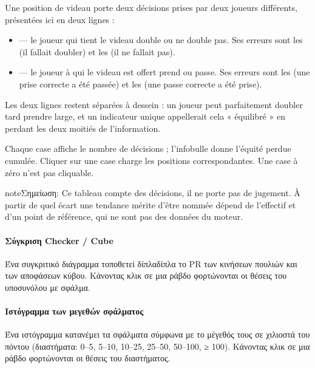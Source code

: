 \documentclass[letterpaper,10pt,greek]{sphinxmanual}
\begin{document}
\sphinxAtStartPar
Une position de videau porte deux décisions prises par deux joueurs
différents, présentées ici en deux lignes :
\begin{itemize}
\item {} 
\sphinxAtStartPar
{} — le joueur qui tient le videau double ou ne double pas. Ses
erreurs sont les  (il fallait doubler) et les  (il ne fallait pas).

\item {} 
\sphinxAtStartPar
{} — le joueur à qui le videau est offert prend ou passe. Ses
erreurs sont les  (une prise correcte a été passée) et les
 (une passe correcte a été prise).

\end{itemize}

\sphinxAtStartPar
Les deux lignes restent séparées à dessein : un joueur peut parfaitement
doubler tard  prendre large, et un indicateur unique appellerait cela
« équilibré » en perdant les deux moitiés de l’information.

\sphinxAtStartPar
Chaque case affiche le nombre de décisions ; l’infobulle donne l’équité perdue
cumulée. Cliquer sur une case charge les positions correspondantes. Une case à
zéro n’est pas cliquable.

\begin{sphinxadmonition}{note}{Σημείωση:}
\sphinxAtStartPar
Ce tableau compte des décisions, il ne porte pas de jugement. À partir de
quel écart une tendance mérite d’être nommée dépend de l’effectif et d’un
point de référence, qui ne sont pas des données du moteur.
\end{sphinxadmonition}


\paragraph{Σύγκριση Checker / Cube}
\label{\detokenize{manuel:repartition-checker-cube}}
\sphinxAtStartPar
Ένα συγκριτικό διάγραμμα τοποθετεί δίπλα\sphinxhyphen{}δίπλα το PR των κινήσεων πουλιών και των αποφάσεων κύβου. Κάνοντας κλικ σε μια ράβδο φορτώνονται οι θέσεις του υποσυνόλου με σφάλμα.


\paragraph{Ιστόγραμμα των μεγεθών σφάλματος}
\label{\detokenize{manuel:histogramme-des-magnitudes-d-erreur}}
\sphinxAtStartPar
Ένα ιστόγραμμα κατανέμει τα σφάλματα σύμφωνα με το μέγεθός τους σε χιλιοστά του πόντου (διαστήματα: 0–5, 5–10, 10–25, 25–50, 50–100, ≥ 100). Κάνοντας κλικ σε μια ράβδο φορτώνονται οι θέσεις του διαστήματος.
\end{document}
